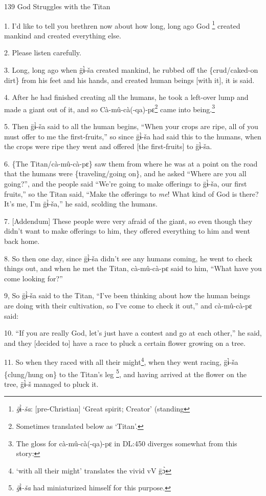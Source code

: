
139 God Struggles with the Titan

1. I'd like to tell you brethren now about how long, long ago God \footnote{\textit{g̈}ɨ̀\textit{-ša}: [pre-Christian] `Great spirit; Creator' (standing} created mankind
and created everything else.

2. Please listen carefully.

3. Long, long ago when g̈ɨ̀-ša created mankind, he rubbed off the \{crud/caked-on
dirt\} from his  feet and his hands, and created human beings [with it], it is
said.

4. After he had finished creating all the humans, he took a left-over lump and
made a giant out of it, and so Cà-mû-cà(-qa)-pɛ\footnote{Sometimes translated below as `Titan'.} came into being.\footnote{The gloss for cà-mû-cà(-qa)-pɛ in DL:450 diverges somewhat from this story:}

5. Then g̈ɨ̀-ša said to all the human begins, ``When your crops are ripe, all
of you must offer to me the first-fruits,'' so since g̈ɨ̀-ša had said this
to the humans, when the crops were ripe they went and offered [the first-fruits]
to g̈ɨ̀-ša.

6. \{The Titan/cà-mû-cà-pɛ\} saw them from where he was at a point on the road
that the humans were \{traveling/going on\}, and he asked ``Where are you all going?'',
and the people said ``We're going to make offerings to g̈ɨ̀-ša, our first fruits,''
so the Titan said, ``Make the offerings to \textit{me}! What kind of God is there?
It's me, I'm g̈ɨ̀-ša,'' he said, scolding the humans.

7. [Addendum] These people were very afraid of the giant, so even though they didn't
want to make offerings to him, they offered everything to him and went back home.

8. So then one day, since g̈ɨ̀-ša didn't see any humans coming, he went to
check things out, and when he met the Titan, cà-mû-cà-pɛ said to him, ``What
have you come looking for?''

9, So g̈ɨ̀-ša said to the Titan, ``I've been thinking about how the human beings
are doing with their cultivation, so I've come to check it out,'' and cà-mû-cà-pɛ
said:

10. ``If you are really God, let's just have a contest and go at each other,''
he said, and they [decided to] have a race to pluck a certain flower growing on
a tree.

11. So when they raced with all their might\footnote{`with all their might' translates the vivid vV g̈ɔ̀}, when they went racing, g̈ɨ̀-ša
\{clung/hung on\} to the Titan's leg \footnote{\textit{g̈}ɨ̀\textit{-ša }had miniaturized himself for this purpose.}, and having arrived at the flower on the
tree, g̈ɨ̀-š managed to pluck it.

